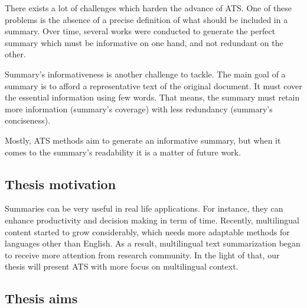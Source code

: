 \documentclass[12pt, oneside, a4paper]{article}
\begin{document}
There exists a lot of challenges which harden the advance of ATS. 
One of these problems is the absence of a precise definition of what should be included in a summary. 
Over time, several works were conducted to generate the perfect summary which must be informative on one hand, and not redundant on the other. 

Summary's informativeness is another challenge to tackle.
The main goal of a summary is to afford a representative text of the original document. 
It must cover the essential information using few words. 
That means, the summary must retain more information (summary's coverage) with less redundancy (summary's conciseness).

Mostly, ATS methods aim to generate an informative summary, but when it comes to the summary's readability it is a matter of future work.  


\subsection{Thesis motivation}

Summaries can be very useful in real life applications.
For instance, they can enhance productivity and decision making in term of time.
Recently, multilingual content started to grow considerably, which needs more adaptable methods for languages other than English.
As a result, multilingual text summarization began to receive more attention from research community. 
In the light of that, our thesis will present ATS with more focus on multilingual context.


\subsection{Thesis aims}
\end{document}
